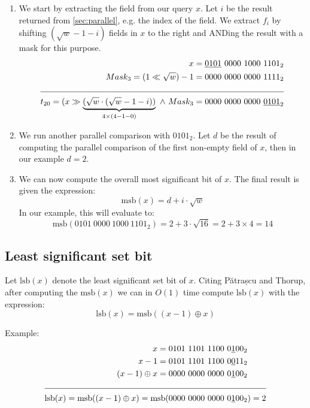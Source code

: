 \begin{enumerate}
    \item
    We start by extracting the field from our query $x$. Let $i$ be the result returned from \ref{sec:parallel}, e.g. the index of the field. We extract $f_i$ by shifting $(\sqrt{w} - 1 - i)$ fields in $x$ to the right and ANDing the result with a mask for this purpose.
    \begin{align*}
        x = \underline{0101}\ 0000\ 1000\ 1101_2 &\\
        Mask_3 = (1 \ll \sqrt{w}) - 1 = 0000\ 0000\ 0000\ 1111_2 &\\
        \cline{1-2}
        t_{20} = (x \gg \underbrace{(\sqrt{w} \cdot (\sqrt{w} - 1 - i))}_{4\times(4-1-0)}\ \wedge\ Mask_3 = 0000\ 0000\ 0000\ \underline{0101}_2 &
    \end{align*}
    \item
    We run another parallel comparison with $0101_2$. Let $d$ be the result of computing the parallel comparison of the first non-empty field of $x$, then in our example $d = 2$.
    \item
    We can now compute the overall most significant bit of $x$. The final result is given the expression:
    \begin{equation*}
        \text{msb}(x) = d + i\cdot\sqrt{w}
    \end{equation*}
    In our example, this will evaluate to:
    \begin{equation*}
        \text{msb}(0101\ 0000\ 1000\ 1101_2) = 2 + 3\cdot\sqrt{16} = 2 + 3 \times 4 = 14
    \end{equation*}
\end{enumerate}

\subsection{Least significant set bit} \label{sec:lsbAlgorithm}

Let $\text{lsb}(x)$ denote the least significant set bit of $x$. Citing Pătrașcu and Thorup, after computing the $\text{msb}(x)$ we can in $O(1)$ time compute $\text{lsb}(x)$ with the expression:
\begin{equation*}
    \text{lsb}(x) = \text{msb}((x - 1) \oplus x)
\end{equation*}

Example:
\begin{align*}
    x = 0101\ 1101\ 1100\ 0\underline{1}00_2& \\
    x - 1 = 0101\ 1101\ 1100\ 0\underline{0}11_2& \\
    (x - 1) \oplus x = 0000\ 0000\ 0000\ 0\underline{1}00_2& \\
    \cline{1-2}
    \text{lsb}(x) = \text{msb}((x - 1) \oplus x) = \text{msb}(0000\ 0000\ 0000\ 0\underline{1}00_2&) = 2
\end{align*}

